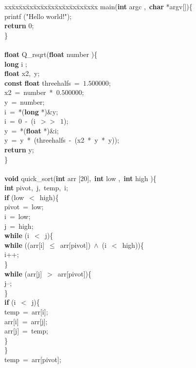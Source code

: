 \begin{tabbing}xx\=xx\=xx\=xx\=xx\=xx\=xx\=xx\=xx\=xx\=xx\=xx\=xx  main({\bf int} argc ,\ {\bf char}  *argv[])\{\+\\
printf ("Hello world!");\\
{\bf return} $0$;\\
\<\}\-\\
\\
{\bf float}  Q\_rsqrt({\bf float} number )\{\+\\
{\bf long} i ;\\
{\bf float}  x2,\ y;\\
{\bf const} {\bf float}  threehalfs\ =\ $1.500000$;\\
 x2\ =\ number\ *\ $0.500000$;\\
 y\ =\ number;\\
 i\ =\ *({\bf long} *)\&y;\\
 i\ =\ $0$\ -\ (i\ $>>$\ $1$);\\
 y\ =\ *({\bf float} *)\&i;\\
 y\ =\ y\ *\ (threehalfs\ -\ (x2\ *\ y\ *\ y));\\
{\bf return} y;\\
\<\}\-\\
\\
{\bf void}  quick\_sort({\bf int} arr [$20$],\ {\bf int} low ,\ {\bf int} high )\{\+\\
{\bf int}  pivot,\ j,\ temp,\ i;\\
{\bf if} (low\ $<$\ high)\{\+\\
 pivot\ =\ low;\\
 i\ =\ low;\\
 j\ =\ high;\\
{\bf while} (i\ $<$\ j)\{\+\\
{\bf while} ((arr[i]\ $\leq$\ arr[pivot])\ $\wedge$\ (i\ $<$\ high))\{\+\\
 i++;\\
\<\}\-\\
{\bf while} (arr[j]\ $>$\ arr[pivot])\{\+\\
 j--;\\
\<\}\-\\
{\bf if} (i\ $<$\ j)\{\+\\
 temp\ =\ arr[i];\\
 arr[i]\ =\ arr[j];\\
 arr[j]\ =\ temp;\\
\<\}\-\\
\<\}\-\\
temp\ =\ arr[pivot];\\

\end{tabbing}
